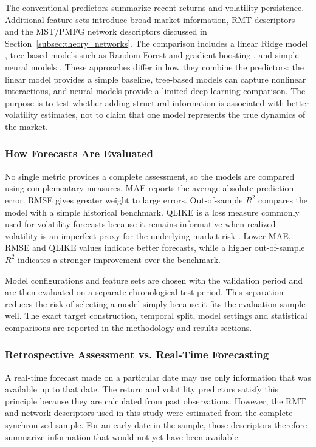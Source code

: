 The conventional predictors summarize recent returns and volatility persistence. Additional feature sets introduce broad market information, RMT descriptors and the MST/PMFG network descriptors discussed in Section~\ref{subsec:theory_networks}. The comparison includes a linear Ridge model \cite{hoerl_kennard_1970_ridge}, tree-based models such as Random Forest and gradient boosting \cite{breiman_2001_random,friedman_2001_greedy}, and simple neural models \cite{bucci_2020_realized,christensen_2022_realized}. These approaches differ in how they combine the predictors: the linear model provides a simple baseline, tree-based models can capture nonlinear interactions, and neural models provide a limited deep-learning comparison. The purpose is to test whether adding structural information is associated with better volatility estimates, not to claim that one model represents the true dynamics of the market.

\subsubsection{How Forecasts Are Evaluated}
No single metric provides a complete assessment, so the models are compared using complementary measures. MAE reports the average absolute prediction error. RMSE gives greater weight to large errors. Out-of-sample $R^2$ compares the model with a simple historical benchmark. QLIKE is a loss measure commonly used for volatility forecasts because it remains informative when realized volatility is an imperfect proxy for the underlying market risk \cite{patton_2011_volatility}. Lower MAE, RMSE and QLIKE values indicate better forecasts, while a higher out-of-sample $R^2$ indicates a stronger improvement over the benchmark.

Model configurations and feature sets are chosen with the validation period and are then evaluated on a separate chronological test period. This separation reduces the risk of selecting a model simply because it fits the evaluation sample well. The exact target construction, temporal split, model settings and statistical comparisons are reported in the methodology and results sections.

\subsubsection{Retrospective Assessment vs. Real-Time Forecasting}
A real-time forecast made on a particular date may use only information that was available up to that date. The return and volatility predictors satisfy this principle because they are calculated from past observations. However, the RMT and network descriptors used in this study were estimated from the complete synchronized sample. For an early date in the sample, those descriptors therefore summarize information that would not yet have been available.

